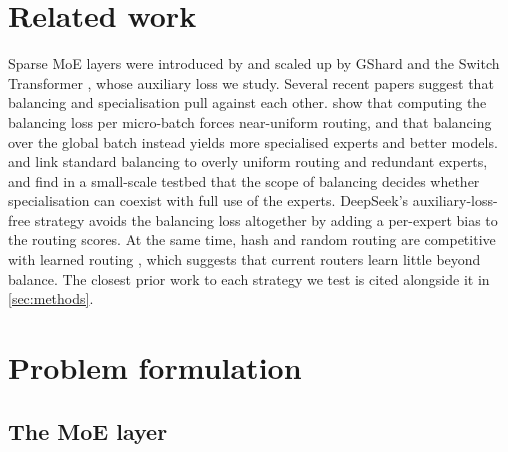 \documentclass[10pt]{article}
\theoremstyle{definition}
\theoremstyle{remark}
\begin{document}
\section{Related work}
\label{sec:related}
Sparse MoE layers were introduced by \citet{shazeer2017outrageously} and scaled up by GShard \citep{lepikhin2021gshard} and the Switch Transformer \citep{fedus2022switch}, whose auxiliary loss we study. Several recent papers suggest that balancing and specialisation pull against each other. \citet{qiu2025demons} show that computing the balancing loss per micro-batch forces near-uniform routing, and that balancing over the global batch instead yields more specialised experts and better models. \citet{omi2025similarity} and \citet{guo2025advancing} link standard balancing to overly uniform routing and redundant experts, and \citet{falke2026testbed} find in a small-scale testbed that the scope of balancing decides whether specialisation can coexist with full use of the experts. DeepSeek's auxiliary-loss-free strategy \citep{wang2024auxfree,deepseekai2024v3} avoids the balancing loss altogether by adding a per-expert bias to the routing scores. At the same time, hash and random routing are competitive with learned routing \citep{roller2021hash,zuo2022thor,fan2024empirical}, which suggests that current routers learn little beyond balance. The closest prior work to each strategy we test is cited alongside it in \cref{sec:methods}.

\section{Problem formulation}
\label{sec:problem}

\subsection{The MoE layer}
\end{document}
